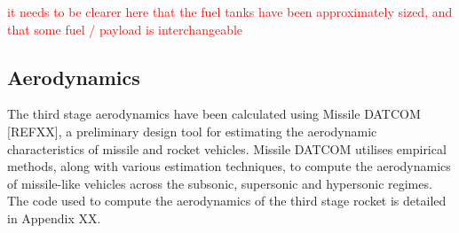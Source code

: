 		\textcolor{red}{it needs to be clearer here that the fuel tanks have been approximately sized, and that some fuel / payload is interchangeable}
		
		
		
		
		\subsection{Aerodynamics}
		
		The third stage aerodynamics have been calculated using Missile DATCOM [REFXX], a preliminary design tool for estimating the aerodynamic characteristics of missile and rocket vehicles. Missile DATCOM utilises empirical methods, along with various estimation techniques, to compute the aerodynamics of missile-like vehicles across the subsonic, supersonic and hypersonic regimes.  The code used to compute the aerodynamics of the third stage rocket is detailed in Appendix XX.  
		

